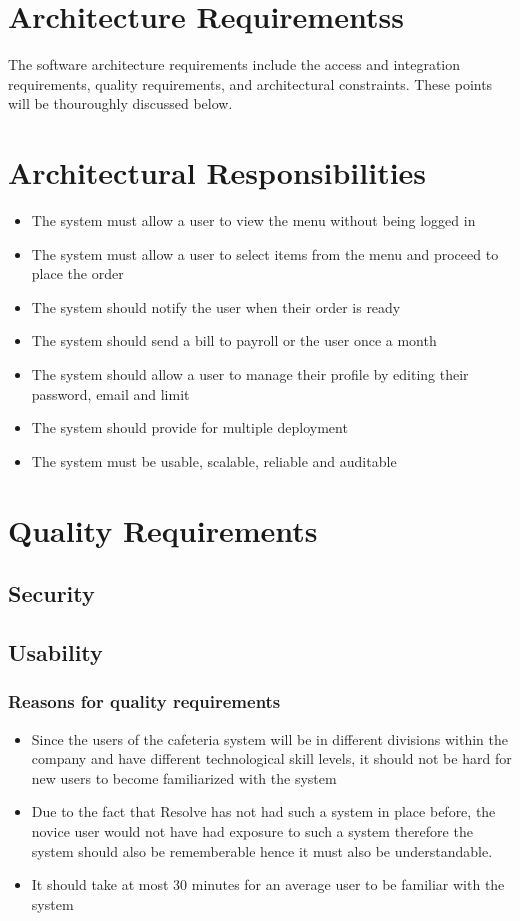 \documentclass[a4paper,12pt]{article}
\begin{document}
\section{Architecture Requirementss}
The software architecture requirements include the access and integration requirements, quality
requirements, and architectural constraints. These points will be thouroughly discussed below.

\section{Architectural Responsibilities}
\begin{itemize}
\item The system must allow a user to view the menu without being logged in
\item The system must allow a user to select items from the menu and proceed to place the order
\item The system should notify the user when their order is ready
\item The system should send a bill to payroll or the user  once a month
\item The system should allow a user to manage their profile by editing their password, email and limit
\item The system should provide for multiple deployment
\item The system must be usable, scalable, reliable and auditable
\end{itemize}

\section{Quality Requirements}

\subsection{Security}

\subsection{Usability}
 \subsubsection{Reasons for quality requirements}
 \begin{itemize}
 \item Since the users of the cafeteria system will be in different divisions within the company and have different technological skill levels, it should not be hard for new users to become familiarized with the system
 \item Due to the fact that Resolve has not had such a system in place before, the novice user would not have had exposure to such a system therefore the system should also be rememberable hence it must also be understandable. 
	\item It should take at most 30 minutes for an average user to be familiar with the system
 \end{itemize}
\end{document}
